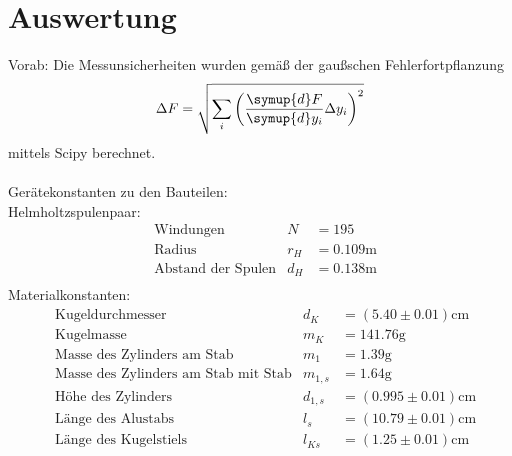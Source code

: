 \section{Auswertung}
\label{sec:Auswertung}
Vorab: Die Messunsicherheiten wurden gemäß der gaußschen Fehlerfortpflanzung
\begin{equation}
  \label{eqn:Gauss}
  \Delta F = \sqrt{\sum_i\left(\frac{\symup{d}F}{\symup{d}y_i}\Delta y_i \right)^2}
\end{equation}
mittels Scipy \cite{scipy}  berechnet.\\
\\
Gerätekonstanten zu den Bauteilen:\\
Helmholtzspulenpaar:
\begin{align*}
    &\text{Windungen}& N &= 195 \\
    &\text{Radius}& r_H &= 0.109 \unit{\metre} \\
    &\text{Abstand der Spulen}& d_H &= 0.138 \unit{\metre} \\
\end{align*}
Materialkonstanten:
\begin{align*}
    &\text{Kugeldurchmesser}& d_K &= (5.40 \pm 0.01) \unit{\centi\metre} \\
    &\text{Kugelmasse}& m_K &=  141.76  \unit{\gram} \\
    &\text{Masse des Zylinders am Stab}& m_1 &=  1.39  \unit{\gram} \\
    &\text{Masse des Zylinders am Stab mit Stab}& m_{1,s} &= 1.64 \unit{\gram} \\
    &\text{Höhe des Zylinders}& d_{1,s} &= (0.995 \pm 0.01) \unit{\centi\metre} \\
    &\text{Länge des Alustabs}& l_s &= (10.79 \pm 0.01) \unit{\centi\metre} \\
    &\text{Länge des Kugelstiels}& l_{Ks} &= (1.25 \pm 0.01) \unit{\centi\metre} \\
\end{align*}

